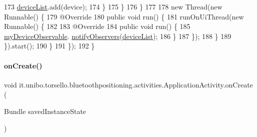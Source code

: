 \begin{DoxyCode}
173                             \hyperlink{classit_1_1unibo_1_1torsello_1_1bluetoothpositioning_1_1activities_1_1ApplicationActivity_ad146f35cfee210f7191442658a235a2f_ad146f35cfee210f7191442658a235a2f}{deviceList}.add(device);
174                         \}
175                     \}
176                 \}
177 
178                 \textcolor{keyword}{new} Thread(\textcolor{keyword}{new} Runnable() \{
179                     @Override
180                     \textcolor{keyword}{public} \textcolor{keywordtype}{void} run() \{
181                         runOnUiThread(\textcolor{keyword}{new} Runnable() \{
182 
183                             @Override
184                             \textcolor{keyword}{public} \textcolor{keywordtype}{void} run() \{
185                                 \hyperlink{classit_1_1unibo_1_1torsello_1_1bluetoothpositioning_1_1activities_1_1ApplicationActivity_aa6481e11e062d3539e6848f0790852b8_aa6481e11e062d3539e6848f0790852b8}{myDeviceObservable}.
      \hyperlink{classit_1_1unibo_1_1torsello_1_1bluetoothpositioning_1_1observables_1_1DeviceObservable_aaf183e537e44cbd114c8eb76432da191_aaf183e537e44cbd114c8eb76432da191}{notifyObservers}(\hyperlink{classit_1_1unibo_1_1torsello_1_1bluetoothpositioning_1_1activities_1_1ApplicationActivity_ad146f35cfee210f7191442658a235a2f_ad146f35cfee210f7191442658a235a2f}{deviceList});
186                             \}
187                         \});
188                     \}
189                 \}).start();
190             \}
191         \});
192     \}
\end{DoxyCode}
\hypertarget{classit_1_1unibo_1_1torsello_1_1bluetoothpositioning_1_1activities_1_1ApplicationActivity_a395bfa7ec016998b254b9e197ef8d754_a395bfa7ec016998b254b9e197ef8d754}{}\label{classit_1_1unibo_1_1torsello_1_1bluetoothpositioning_1_1activities_1_1ApplicationActivity_a395bfa7ec016998b254b9e197ef8d754_a395bfa7ec016998b254b9e197ef8d754} 
\paragraph{\texorpdfstring{on\+Create()}{onCreate()}}
{\footnotesize\ttfamily void it.\+unibo.\+torsello.\+bluetoothpositioning.\+activities.\+Application\+Activity.\+on\+Create (\begin{DoxyParamCaption}\item[{Bundle}]{saved\+Instance\+State }\end{DoxyParamCaption})}



